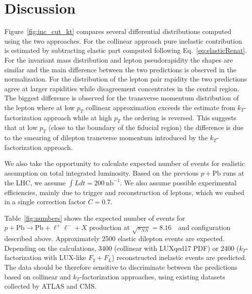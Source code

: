 \clearpage
\section{Discussion}
\label{sec:discussion}

Figure~\ref{fig:inc_cut_kt} compares several differential distributions computed using the two approaches. For the collinear approach pure inelastic contribution is estimated by
subtracting elastic part computed following Eq.~\ref{eq:elasticRenat}.
For the invariant mass distribution and lepton pseudorapidity the shapes are similar and
the main difference between the two predictions is observed in the normalization.
For the distribution of the lepton pair rapidity the two predictions agree at larger rapidities while disagreement concentrates
in the central region. The biggest difference is observed for the transverse momentum distribution of the lepton where at low $p_T$ collinear approximation exceeds the estimate
from $k_T$-factorization approach while at high $p_T$ the ordering is reversed.  
This suggests that at low $p_T$ (close to the boundary of the fiducial region) the difference is due to the smearing of dilepton transverse momentum introduced by the $k_T$-factorization approach.

We also take the opportunity to calculate expected number of events for realistic assumption on total integrated luminosity.
Based on the previous $p+\textrm{Pb}$ runs at the LHC, we assume  $\int Ldt= 200~\textrm{nb}^{-1}$.
We also assume possible experimental efficiencies, mainly due to trigger and reconstruction of leptons, which we embed in a single correction factor $C=0.7$.

Table~\ref{fig:numbers} shows the expected number of events for $p+\textrm{Pb}\rightarrow \textrm{Pb} + \ell^+\ell^- + X$ production at $\sqrt{s_{N N}} = 8.16$~\TeV\ and configuration described above. 
Approximately 2500 elastic dilepton events are expected. 
Depending on the calculations, 3400 (collinear with LUXqed17 PDF) or 2400 ($k_T$-factorization with LUX-like $F_2+F_L$) reconstructed inelastic events are predicted. 
The data should be therefore sensitive to discriminate between the predictions based on  
collinear and $k_T$-factorization approaches, using existing datasets collected by ATLAS and CMS.




